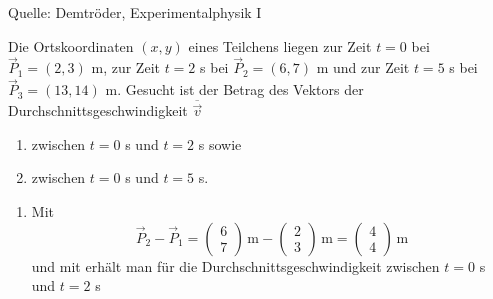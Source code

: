 \begin{MExercises}
\begin{MExercise}
            Quelle: Demtr\"oder, Experimentalphysik I
            \end{MExercise}
            
            \begin{MExercise}
                 Die Ortskoordinaten $(x,y)$ eines Teilchens liegen zur Zeit $t=0$ bei $\vec{P}_1=(2,3)$ m, zur Zeit $t= 2$ s bei $\vec{P}_2=(6,7)$ m und zur Zeit $t= 5$ s bei $\vec{P}_3=(13,14)$ m. Gesucht ist der Betrag des Vektors der Durchschnittsgeschwindigkeit $\overline{\vec{v}}$
                 \begin{enumerate}
                 \item zwischen $t=0$ s und $t=2$ s sowie
                 \item zwischen $t=0$ s und $t=5$ s. 
                 \end{enumerate} 
                 \begin{MSolution}
                 \begin{enumerate}
                 \item  Mit 
                 \begin{equation*}
                 \vec{P}_2-\vec{P}_1=\left(\begin{array}{c} 6 \\ 7 \end{array}\right)\,\text{m}-\left(\begin{array}{c} 2 \\ 3 \end{array}\right)\,\text{m}=\left(\begin{array}{c} 4 \\4 \end{array}\right)\,\text{m}
                 \end{equation*} und mit  erh\"alt man f\"ur die Durchschnittsgeschwindigkeit zwischen $t=0$ s und $t=2$ s
                

\end{enumerate}
\end{MSolution}
\end{MExercise}
\end{MExercises}
